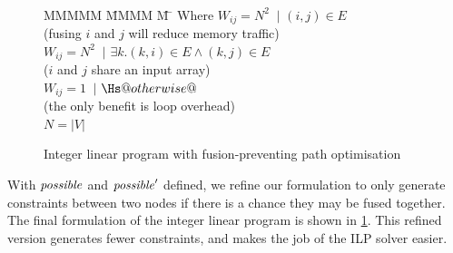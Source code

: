 \begin{figure}
\begin{tabbing}
\\[0.5ex]
MMMMM   \= MMMM \= M \= \kill
Where      \> $W_{ij} = N^2$ \> $~|$ \> $(i,j) \in E $         \\
           \> \> \> (fusing $i$ and $j$ will reduce memory traffic)         \\
           \> $W_{ij} = N^2$ \> $~|$ \> $\exists k. (k,i) \in E \wedge (k,j) \in E $     \\
           \> \> \> ($i$ and $j$ share an input array)                                         \\
           \> $W_{ij} = 1$   \> $~|$ \> $\Hs@otherwise@$                                                  \\
           \> \> \> (the only benefit is loop overhead)                                        
\\
           \> $N = |V|$
\end{tabbing}
\caption{Integer linear program with fusion-preventing path optimisation}
\label{fig:clustering:ilp-fpo}
\end{figure}

With $\mathit{possible}$ and $\mathit{possible}'$ defined, we refine our formulation to only generate constraints between two nodes if there is a chance they may be fused together.
The final formulation of the integer linear program is shown in \cref{fig:clustering:ilp-fpo}.
This refined version generates fewer constraints, and makes the job of the ILP solver easier.

% 
